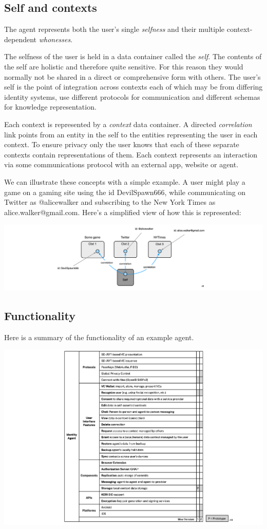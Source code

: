 \documentclass[11pt, oneside]{article}   	%
\begin{document}
\subsection{Self and contexts}
The agent represents both the user's single \emph{selfness} and their multiple context-dependent \emph{whonesses}.

The selfness of the user is held in a data container called the \emph{self}. The contents of the self are holistic and therefore quite sensitive. For this reason they would normally not be shared in a direct or comprehensive form with others. The user's self is the point of integration across contexts each of which may be from differing identity systems, use different protocols for communication and different schemas for knowledge representation.

Each context is represented by a \emph{context} data container. A directed \emph{correlation} link points from an entity in the self to the entities representing the user in each context. To ensure privacy only the user knows that each of these separate contexts contain representations of them. Each context represents an interaction via some communications protocol with an external app, website or agent. 

We can illustrate these concepts with a simple example. A user might play a game on a gaming site using the id DevilSpawn666, while communicating on Twitter as @alicewalker and subscribing to the New York Times as alice.walker@gmail.com. Here's a simplified view of how this is represented:

\includegraphics[width=\textwidth]{./images/example1.png}

\subsection{Functionality}

Here is a summary of the functionality of an example agent.

\includegraphics[width=\textwidth]{./images/agent-functionality.png}
\end{document}
